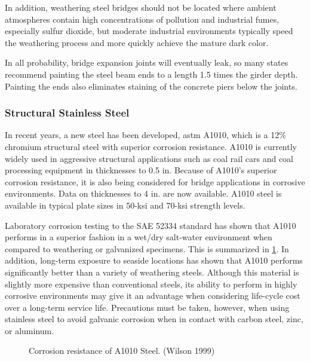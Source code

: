 In addition, weathering steel bridges should not be located where ambient atmospheres contain high concentrations of pollution and industrial fumes, especially sulfur dioxide, but moderate industrial environments typically speed the weathering process and more quickly achieve the mature dark color.

In all probability, bridge expansion joints will eventually leak, so many states recommend painting the steel beam ends to a length 1.5 times the girder depth. Painting the ends also eliminates staining of the concrete piers below the joints.

\subsubsection{Structural Stainless Steel}

In recent years, a new steel has been developed, \acrshort*{astm} A1010, which is a 12\% chromium structural steel with superior corrosion resistance. A1010 is currently widely used in aggressive structural applications such as coal rail cars and coal processing equipment in thicknesses to 0.5 in. Because of A1010’s superior corrosion resistance, it is also being considered for bridge applications in corrosive environments. Data on thicknesses to 4 in. are now available. A1010 steel is available in typical plate sizes in 50-ksi and 70-ksi strength levels.

Laboratory corrosion testing to the SAE 52334 standard has shown that A1010 performs in a superior fashion in a wet/dry salt-water environment when compared to weathering or galvanized specimens. This is summarized in \cref{fig:corrosion-resistance-a1010}. In addition, long-term exposure to seaside locations has shown that A1010 performs significantly better than a variety of weathering steels. Although this material is slightly more expensive than conventional steels, its ability to perform in highly corrosive environments may give it an advantage when considering life-cycle cost over a long-term service life. Precautions must be taken, however, when using stainless steel to avoid galvanic corrosion when in contact with carbon steel, zinc, or aluminum.

\begin{figure}
  \caption{Corrosion resistance of A1010 Steel. (Wilson 1999)}
  \label{fig:corrosion-resistance-a1010}
\end{figure}

